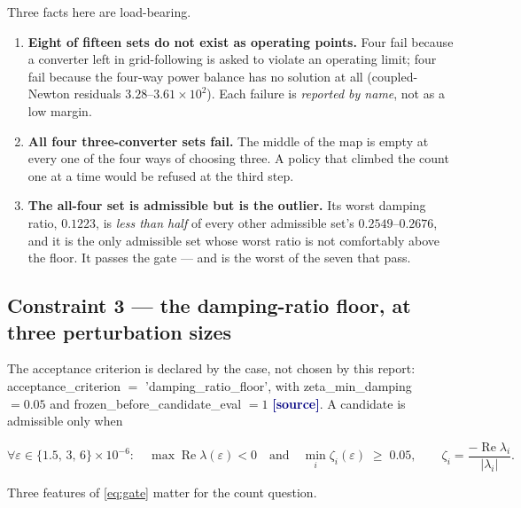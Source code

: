 \documentclass[12pt,a4paper]{article}
\theoremstyle{remark}
\newcommand{\code}[1]{{\ttfamily\small\hyphenchar\font=-1 #1}}
\newcommand{\sourcecode}{\textcolor{navy}{\textbf{[source]}}}
\begin{document}
Three facts here are load-bearing.

\begin{enumerate}[leftmargin=1.7em,itemsep=3pt]
\item \textbf{Eight of fifteen sets do not exist as operating points.} Four
      fail because a converter left in grid-following is asked to violate an
      operating limit; four fail because the four-way power balance has no
      solution at all (coupled-Newton residuals $3.28$--$3.61\times10^{2}$).
      Each failure is \emph{reported by name}, not as a low margin.
\item \textbf{All four three-converter sets fail.} The middle of the map is
      empty at every one of the four ways of choosing three. A policy that
      climbed the count one at a time would be refused at the third step.
\item \textbf{The all-four set is admissible but is the outlier.} Its worst
      damping ratio, $0.1223$, is \emph{less than half} of every other
      admissible set's $0.2549$--$0.2676$, and it is the only admissible set
      whose worst ratio is not comfortably above the floor. It passes the gate
      --- and is the worst of the seven that pass.
\end{enumerate}

\subsection{Constraint 3 --- the damping-ratio floor, at three perturbation
sizes}

The acceptance criterion is declared by the case, not chosen by this report:
\code{acceptance\_criterion} $=$ \code{'damping\_ratio\_floor'}, with
\code{zeta\_min\_damping} $= 0.05$ and
\code{frozen\_before\_candidate\_eval} $= 1$ \sourcecode. A candidate is
admissible only when

\begin{equation}
\forall \varepsilon \in \{1.5,\,3,\,6\}\times10^{-6}:\quad
\max\operatorname{Re}\lambda(\varepsilon) < 0
\quad\text{and}\quad
\min_i \zeta_i(\varepsilon) \;\ge\; 0.05,
\qquad
\zeta_i = \frac{-\operatorname{Re}\lambda_i}{|\lambda_i|}.
\label{eq:gate}
\end{equation}

Three features of \eqref{eq:gate} matter for the count question.
\end{document}
